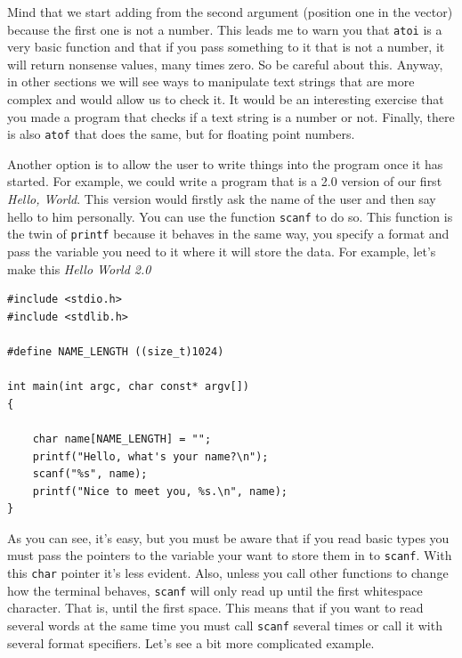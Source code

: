 \documentclass[a4paper]{article}
\begin{document}
Mind that we start adding from the second argument (position one in the vector)
because the first one is not a number. This leads me to warn you that
\verb!atoi! is a very basic function and that if you pass something to it that
is not a number, it will return nonsense values, many times zero. So be careful
about this. Anyway, in other sections we will see ways to manipulate text
strings that are more complex and would allow us to check it. It would be an
interesting exercise that you made a program that checks if a text string is a
number or not. Finally, there is also \verb!atof! that does the same, but for
floating point numbers.

Another option is to allow the user to write things into the program once
it has started. For example, we could write a program that is a 2.0 version of
our first \textit{Hello, World}. This version would firstly ask the name of the
user and then say hello to him personally. You can use the function \verb!scanf!
to do so. This function is the twin of \verb!printf! because it behaves in the
same way, you specify a format and pass the variable you need to it where it
will store the data. For example, let's make this \textit{Hello World 2.0}

\noindent
\begin{minipage}[H]{\linewidth}
\mbox{}
\begin{lstlisting}[style=C,
caption={\texttt{scanf} basic example},
label={lst:basicScanf}]
#include <stdio.h>
#include <stdlib.h>

#define NAME_LENGTH ((size_t)1024)

int main(int argc, char const* argv[])
{

    char name[NAME_LENGTH] = "";
    printf("Hello, what's your name?\n");
    scanf("%s", name);
    printf("Nice to meet you, %s.\n", name);
}
\end{lstlisting}
\end{minipage}

As you can see, it's easy, but you must be aware that if you read basic types
you must pass the pointers to the variable your want to store them in to
\texttt{scanf}. With this \verb!char! pointer it's less evident. Also, unless
you call other functions to change how the terminal behaves, \verb!scanf! will
only read up until the first whitespace character. That is, until the first
space. This means that if you want to read several words at the same time you
must call \verb!scanf! several times or call it with several format specifiers.
Let's see a bit more complicated example.
\end{document}
